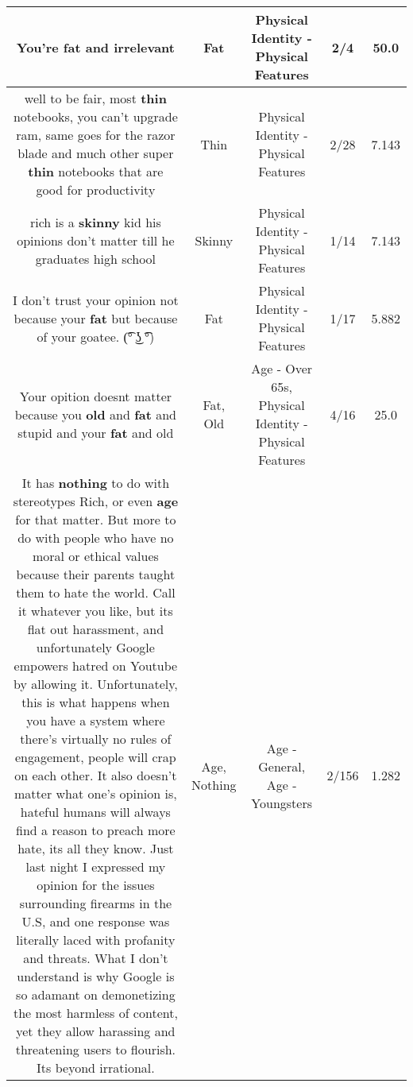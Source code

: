 \documentclass[11pt]{article}
\newlength\mylength
\begin{document}
\begin{center}
\begin{longtable}{|C{.65\mylength}|C{.30\mylength}|C{.12\mylength}|C{.12\mylength}|C{.12\mylength}|}
  \small You're \textbf{fat} and irrelevant\normalsize   & Fat & Physical Identity - Physical Features & 2/4 & 50.0 \\  \hline
  \small well to be fair, most \textbf{thin} notebooks, you can't upgrade ram, same goes for the razor blade and much other super \textbf{thin} notebooks that are good for productivity\normalsize   & Thin & Physical Identity - Physical Features & 2/28 & 7.143 \\  \hline
  \small rich is a \textbf{skinny} kid his opinions don't matter till he graduates high school\normalsize   & Skinny & Physical Identity - Physical Features & 1/14 & 7.143 \\  \hline
  \small I don't trust your opinion not because your \textbf{fat} but because of your goatee. (͡° ͜ʖ ͡°)\normalsize   & Fat & Physical Identity - Physical Features & 1/17 & 5.882 \\  \hline
  \small Your opition doesnt matter because you \textbf{old} and \textbf{fat} and stupid and your \textbf{fat} and old\normalsize   & Fat, Old & Age - Over 65s, Physical Identity - Physical Features & 4/16 & 25.0 \\  \hline
  \small It has \textbf{nothing} to do with stereotypes Rich, or even \textbf{age} for that matter. But more to do with people who have no moral or ethical values because their parents taught them to hate the world. Call it whatever you like, but its flat out harassment, and unfortunately Google empowers hatred on Youtube by allowing it. Unfortunately, this is what happens when you have a system where there's virtually no rules of engagement, people will crap on each other. It also doesn't matter what one's opinion is, hateful humans will always find a reason to preach more hate, its all they know. Just last night I expressed my opinion for the issues surrounding firearms in the U.S, and one response was literally laced with profanity and threats. What I don't understand is why Google is so adamant on demonetizing the most harmless of content, yet they allow harassing and threatening users to flourish. Its beyond irrational.\normalsize   & Age, Nothing & Age - General, Age - Youngsters & 2/156 & 1.282 \\  \hline

\end{longtable}
\end{center}
\end{document}
